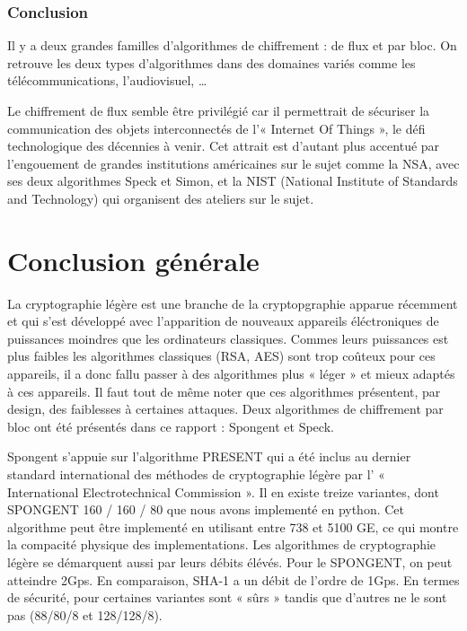 	\section{Conclusion}

	 Il y a deux grandes familles d'algorithmes de chiffrement : de flux et par
	bloc. On retrouve les deux types d'algorithmes dans des domaines variés comme
	les télécommunications, l'audiovisuel, \dots

	Le chiffrement de flux semble être privilégié car il permettrait de sécuriser
	la communication des objets interconnectés de l'« Internet Of Things », le
	défi technologique des décennies à venir. Cet attrait est d'autant plus
	accentué par l'engouement de grandes institutions américaines sur le sujet
	comme la NSA, avec ses deux algorithmes Speck et Simon, et la NIST (National
	Institute of Standards and Technology) qui organisent des ateliers sur le
	sujet.

\newpage
\part*{Conclusion générale}

La cryptographie légère est une branche de la cryptopgraphie apparue récemment
et qui s'est développé avec l'apparition de nouveaux appareils éléctroniques de
puissances moindres que les ordinateurs classiques. Commes leurs puissances est
plus faibles les algorithmes classiques (RSA, AES) sont trop coûteux pour ces
appareils, il a donc fallu passer à des algorithmes plus « léger » et mieux
adaptés à ces appareils. Il faut tout de même noter que ces algorithmes
présentent, par design, des faiblesses à certaines attaques. Deux algorithmes de
chiffrement par bloc ont été présentés dans ce rapport : Spongent et Speck.

Spongent s'appuie sur l'algorithme PRESENT qui a été inclus au dernier standard
international des méthodes de cryptographie légère par l’ « International
Electrotechnical Commission ». Il en existe treize variantes, dont SPONGENT 160 /
160 / 80 que nous avons implementé en python. Cet algorithme peut être
implementé en utilisant entre 738 et 5100 GE, ce qui montre la compacité
physique des implementations. Les algorithmes de cryptographie légère se
démarquent aussi par leurs débits élévés. Pour le SPONGENT, on peut atteindre
2Gps. En comparaison, SHA-1 a un débit de l'ordre de 1Gps. En termes de
sécurité, pour certaines variantes sont « sûrs » tandis que d'autres ne le sont
pas (88/80/8 et 128/128/8).

